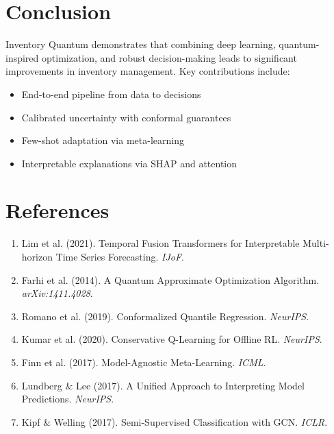 \documentclass[11pt,a4paper]{article}
\begin{document}
\section{Conclusion}

Inventory Quantum demonstrates that combining deep learning, quantum-inspired optimization, and robust decision-making leads to significant improvements in inventory management. Key contributions include:

\begin{itemize}
    \item End-to-end pipeline from data to decisions
    \item Calibrated uncertainty with conformal guarantees
    \item Few-shot adaptation via meta-learning
    \item Interpretable explanations via SHAP and attention
\end{itemize}

\section*{References}

\begin{enumerate}
    \item Lim et al. (2021). Temporal Fusion Transformers for Interpretable Multi-horizon Time Series Forecasting. \textit{IJoF}.
    \item Farhi et al. (2014). A Quantum Approximate Optimization Algorithm. \textit{arXiv:1411.4028}.
    \item Romano et al. (2019). Conformalized Quantile Regression. \textit{NeurIPS}.
    \item Kumar et al. (2020). Conservative Q-Learning for Offline RL. \textit{NeurIPS}.
    \item Finn et al. (2017). Model-Agnostic Meta-Learning. \textit{ICML}.
    \item Lundberg \& Lee (2017). A Unified Approach to Interpreting Model Predictions. \textit{NeurIPS}.
    \item Kipf \& Welling (2017). Semi-Supervised Classification with GCN. \textit{ICLR}.
\end{enumerate}
\end{document}
